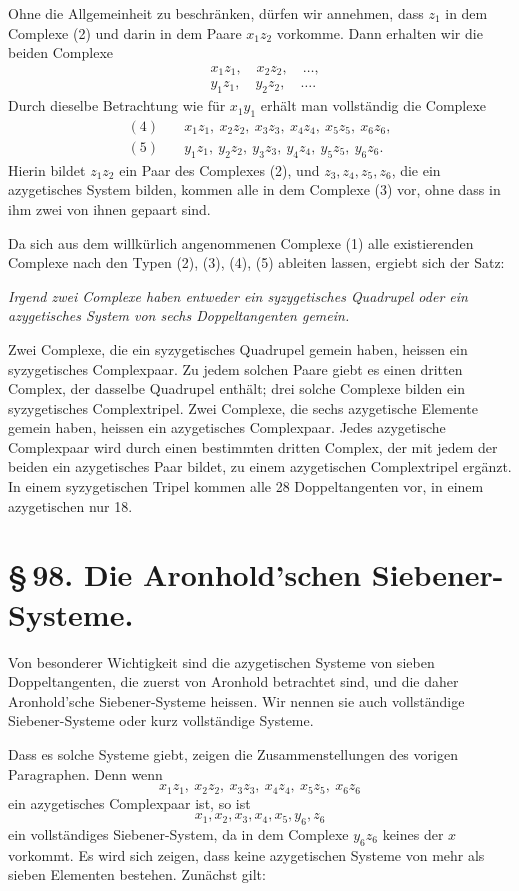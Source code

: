 \documentclass[11pt]{article}
\begin{document}
Ohne die Allgemeinheit zu beschränken, dürfen wir annehmen, dass \(z_1\) in dem Complexe (2) und darin in dem Paare \(x_1z_2\) vorkomme. Dann erhalten wir die beiden Complexe
\begin{align}
&x_1z_1,\quad x_2z_2,\quad \ldots, \tag{4}\\
&y_1z_1,\quad y_2z_2,\quad \ldots. \tag{5}
\end{align}
Durch dieselbe Betrachtung wie für \(x_1y_1\) erhält man vollständig die Complexe
\begin{align*}
(4)&\quad x_1z_1,\ x_2z_2,\ x_3z_3,\ x_4z_4,\ x_5z_5,\ x_6z_6,\\
(5)&\quad y_1z_1,\ y_2z_2,\ y_3z_3,\ y_4z_4,\ y_5z_5,\ y_6z_6.
\end{align*}
Hierin bildet \(z_1z_2\) ein Paar des Complexes (2), und \(z_3,z_4,z_5,z_6\), die ein azygetisches System bilden, kommen alle in dem Complexe (3) vor, ohne dass in ihm zwei von ihnen gepaart sind.

Da sich aus dem willkürlich angenommenen Complexe (1) alle existierenden Complexe nach den Typen (2), (3), (4), (5) ableiten lassen, ergiebt sich der Satz:

\emph{Irgend zwei Complexe haben entweder ein syzygetisches Quadrupel oder ein azygetisches System von sechs Doppeltangenten gemein.}

Zwei Complexe, die ein syzygetisches Quadrupel gemein haben, heissen ein syzygetisches Complexpaar. Zu jedem solchen Paare giebt es einen dritten Complex, der dasselbe Quadrupel enthält; drei solche Complexe bilden ein syzygetisches Complextripel. Zwei Complexe, die sechs azygetische Elemente gemein haben, heissen ein azygetisches Complexpaar. Jedes azygetische Complexpaar wird durch einen bestimmten dritten Complex, der mit jedem der beiden ein azygetisches Paar bildet, zu einem azygetischen Complextripel ergänzt. In einem syzygetischen Tripel kommen alle 28 Doppeltangenten vor, in einem azygetischen nur 18.

\section*{\S\,98. Die Aronhold'schen Siebener-Systeme.}

Von besonderer Wichtigkeit sind die azygetischen Systeme von sieben Doppeltangenten, die zuerst von Aronhold betrachtet sind, und die daher Aronhold'sche Siebener-Systeme heissen. Wir nennen sie auch vollständige Siebener-Systeme oder kurz vollständige Systeme.

Dass es solche Systeme giebt, zeigen die Zusammenstellungen des vorigen Paragraphen. Denn wenn
\[
 x_1z_1,\ x_2z_2,\ x_3z_3,\ x_4z_4,\ x_5z_5,\ x_6z_6
\]
ein azygetisches Complexpaar ist, so ist
\[
 x_1,x_2,x_3,x_4,x_5,y_6,z_6
\]
ein vollständiges Siebener-System, da in dem Complexe \(y_6z_6\) keines der \(x\) vorkommt. Es wird sich zeigen, dass keine azygetischen Systeme von mehr als sieben Elementen bestehen. Zunächst gilt:
\end{document}

